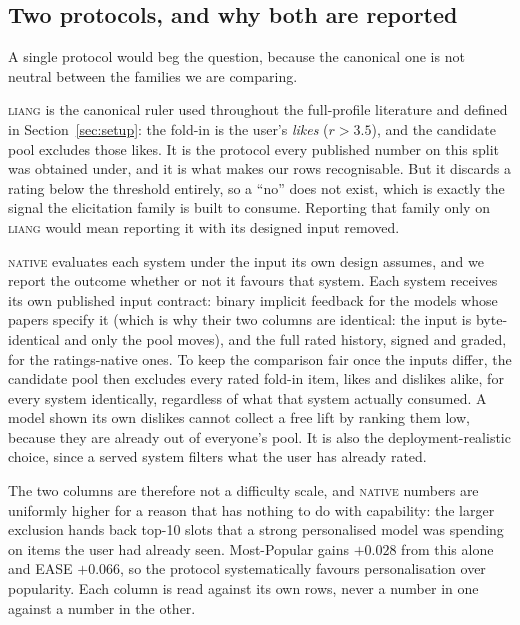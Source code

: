 \documentclass[manuscript,screen]{acmart}
\begin{document}
\subsection{Two protocols, and why both are reported}\label{sec:protocols}
A single protocol would beg the question, because the canonical one is not neutral between the families we are comparing.

\textsc{liang} is the canonical ruler used throughout the full-profile literature and defined in Section~\ref{sec:setup}: the fold-in is the user's \emph{likes} ($r>3.5$), and the candidate pool excludes those likes. It is the protocol every published number on this split was obtained under, and it is what makes our rows recognisable. But it discards a rating below the threshold entirely, so a ``no'' does not exist, which is exactly the signal the elicitation family is built to consume. Reporting that family only on \textsc{liang} would mean reporting it with its designed input removed.

\textsc{native} evaluates each system under the input its own design assumes, and we report the outcome whether or not it favours that system. Each system receives its own published input contract: binary implicit feedback for the models whose papers specify it (which is why their two columns are identical: the input is byte-identical and only the pool moves), and the full rated history, signed and graded, for the ratings-native ones. To keep the comparison fair once the inputs differ, the candidate pool then excludes every rated fold-in item, likes and dislikes alike, for every system identically, regardless of what that system actually consumed. A model shown its own dislikes cannot collect a free lift by ranking them low, because they are already out of everyone's pool. It is also the deployment-realistic choice, since a served system filters what the user has already rated.

The two columns are therefore not a difficulty scale, and \textsc{native} numbers are uniformly higher for a reason that has nothing to do with capability: the larger exclusion hands back top-10 slots that a strong personalised model was spending on items the user had already seen. Most-Popular gains $+0.028$ from this alone and EASE $+0.066$, so the protocol systematically favours personalisation over popularity. Each column is read against its own rows, never a number in one against a number in the other.
\end{document}
